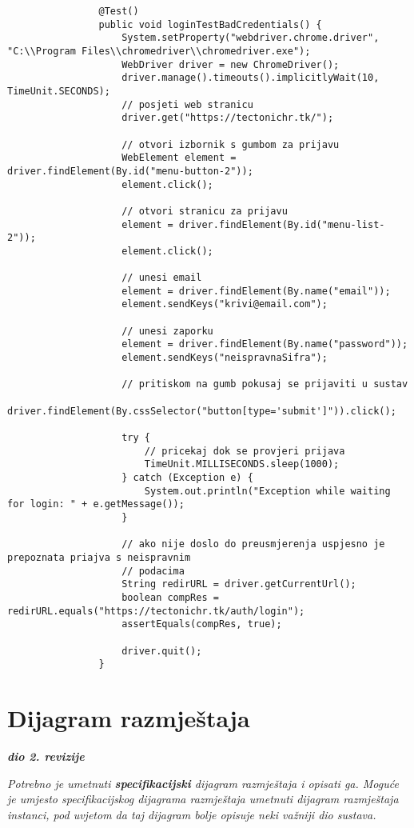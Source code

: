 			\begin{lstlisting}
				@Test()
				public void loginTestBadCredentials() {
					System.setProperty("webdriver.chrome.driver", "C:\\Program Files\\chromedriver\\chromedriver.exe");
					WebDriver driver = new ChromeDriver();
					driver.manage().timeouts().implicitlyWait(10, TimeUnit.SECONDS);
					// posjeti web stranicu
					driver.get("https://tectonichr.tk/");

					// otvori izbornik s gumbom za prijavu
					WebElement element = driver.findElement(By.id("menu-button-2"));
					element.click();

					// otvori stranicu za prijavu
					element = driver.findElement(By.id("menu-list-2"));
					element.click();

					// unesi email
					element = driver.findElement(By.name("email"));
					element.sendKeys("krivi@email.com");

					// unesi zaporku
					element = driver.findElement(By.name("password"));
					element.sendKeys("neispravnaSifra");

					// pritiskom na gumb pokusaj se prijaviti u sustav
					driver.findElement(By.cssSelector("button[type='submit']")).click();

					try {
						// pricekaj dok se provjeri prijava
						TimeUnit.MILLISECONDS.sleep(1000);
					} catch (Exception e) {
						System.out.println("Exception while waiting for login: " + e.getMessage());
					}

					// ako nije doslo do preusmjerenja uspjesno je prepoznata priajva s neispravnim
					// podacima
					String redirURL = driver.getCurrentUrl();
					boolean compRes = redirURL.equals("https://tectonichr.tk/auth/login");
					assertEquals(compRes, true);

					driver.quit();
				}
				\end{lstlisting}
			
			\eject 
		
		
		\section{Dijagram razmještaja}
			
			\textbf{\textit{dio 2. revizije}}
			
			 \textit{Potrebno je umetnuti \textbf{specifikacijski} dijagram razmještaja i opisati ga. Moguće je umjesto specifikacijskog dijagrama razmještaja umetnuti dijagram razmještaja instanci, pod uvjetom da taj dijagram bolje opisuje neki važniji dio sustava.}
			
